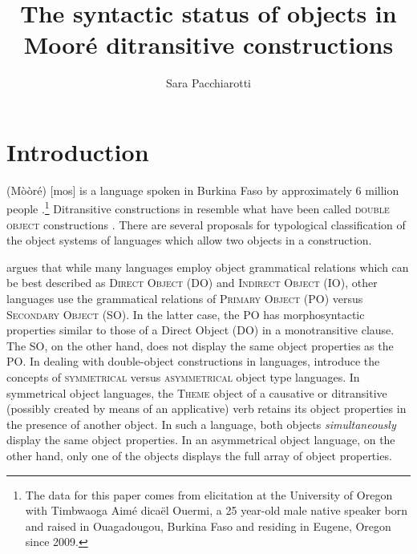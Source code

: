 \documentclass[output=paper]{langsci/langscibook}
\title{The syntactic status of objects in Mooré ditransitive constructions}
\author{%
 Sara Pacchiarotti\affiliation{University of Oregon}
}
\begin{document}


\section{Introduction}\label{§1:introduction.pacchiarotti}

 (Mòòré) [mos] is a  language spoken in Burkina Faso by approximately 6 million people \citep{lewisetal2016}.\footnote{The data for this paper comes from elicitation at the University of Oregon with Timbwaoga Aimé dicaël Ouermi, a 25 year-old male native   speaker born and raised in Ouagadougou, Burkina Faso and residing in Eugene, Oregon since 2009.} Ditransitive constructions in  resemble what have been called \textsc{double object} constructions \citep{dryer1986,dryer2007,goldberg1995}. There are several proposals for typological classification of the object systems of languages which allow two objects in a construction.

\citet{dryer1986} argues that while many languages employ object grammatical relations which can be best described as \textsc{Direct Object} (DO) and \textsc{Indirect Object} (IO), other languages use the grammatical relations of \textsc{Primary Object} (PO) versus \textsc{Secondary Object} (SO). In the latter case, the PO has morphosyntactic properties similar to those of a Direct Object (DO) in a monotransitive clause. The SO, on the other hand, does not display the same object properties as the PO. In dealing with double-object constructions in  languages, \citet{bresnanmoshi1990} introduce the concepts of \textsc{symmetrical} versus \textsc{asymmetrical} object type languages. In symmetrical object languages, the \textsc{Theme} object of a causative or ditransitive (possibly created by means of an applicative) verb retains its object properties in the presence of another object. In such a language, both objects \textit{simultaneously} display the same object properties. In an asymmetrical object language, on the other hand, only one of the objects displays the full array of object properties. 
\end{document}
